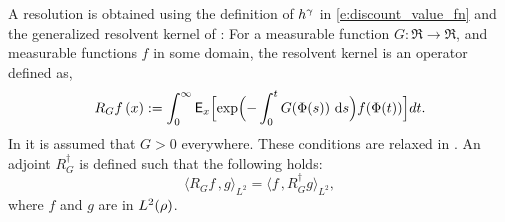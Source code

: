 A resolution is obtained using the definition of $h^\gamma$ in \eqref{e:discount_value_fn} and the generalized resolvent kernel of \cite{nev72,meytwe93e,devkonmey17a}: For a measurable function $G\colon\Re\to\Re$, and measurable functions $f$ in some domain, the resolvent kernel is an operator defined as,
\begin{equation}
R_G f\, (x) := \int_0^\infty \Expect_x\Bigl[ \exp\Bigl(-\int_0^t G(\process(s))\, \rmd s \Bigr) f(\process(t))\Bigr] dt.
\label{e:resolvent_neveu}
\end{equation}
In  \cite{nev72,meytwe93e} it is assumed that $G>0$ everywhere. These conditions are relaxed in \cite{konmey03a,devkonmey17a}. An adjoint $R^\dagger_G$ is defined such that the following holds:
\[
\langle R_G f \, , g \rangle_{L^2} = \langle f \, , R^\dagger_G g \rangle_{L^2}, 
\]
where $f$ and $g$ are in $L^2(\rho)$. 

